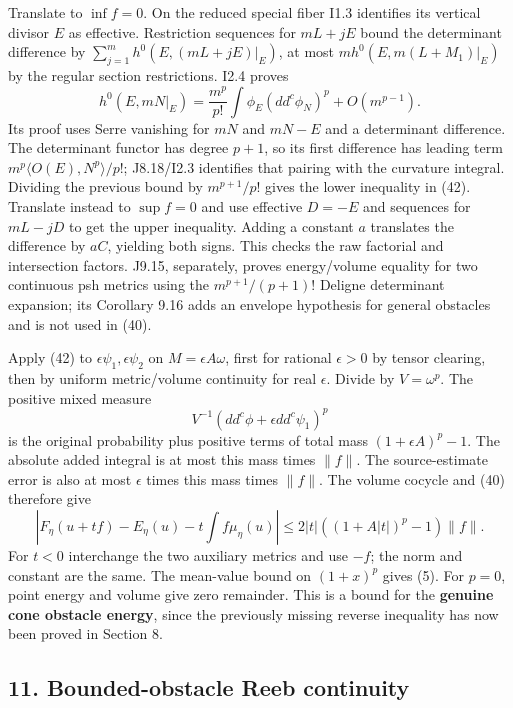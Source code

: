 \documentclass[
  10pt,
]{article}
\begin{document}
Translate to \(\inf f=0\). On the reduced special fiber I1.3 identifies
its vertical divisor \(E\) as effective. Restriction sequences for
\(mL+jE\) bound the determinant difference by
\(\sum_{j=1}^m h^0(E,(mL+jE)|_E)\), at most \(m h^0(E,m(L+M_1)|_E)\) by
the regular section restrictions. I2.4 proves
\[ h^0(E,mN|_E)=\frac{m^p}{p!}\int\phi_E(dd^c\phi_N)^p+O(m^{p-1}). \]
Its proof uses Serre vanishing for \(mN\) and \(mN-E\) and a determinant
difference. The determinant functor has degree \(p+1\), so its first
difference has leading term \(m^p\langle O(E),N^p\rangle/p!\);
J8.18/I2.3 identifies that pairing with the curvature integral. Dividing
the previous bound by \(m^{p+1}/p!\) gives the lower inequality in (42).
Translate instead to \(\sup f=0\) and use effective \(D=-E\) and
sequences for \(mL-jD\) to get the upper inequality. Adding a constant
\(a\) translates the difference by \(aC\), yielding both signs. This
checks the raw factorial and intersection factors. J9.15, separately,
proves energy/volume equality for two continuous psh metrics using the
\(m^{p+1}/(p+1)!\) Deligne determinant expansion; its Corollary 9.16
adds an envelope hypothesis for general obstacles and is not used in
(40).

Apply (42) to \(\epsilon\psi_1,\epsilon\psi_2\) on
\(M=\epsilon A\omega\), first for rational \(\epsilon>0\) by tensor
clearing, then by uniform metric/volume continuity for real
\(\epsilon\). Divide by \(V=\omega^p\). The positive mixed measure
\[ V^{-1}(dd^c\phi+\epsilon dd^c\psi_1)^p \] is the original probability
plus positive terms of total mass \((1+\epsilon A)^p-1\). The absolute
added integral is at most this mass times \(\|f\|\). The source-estimate
error is also at most \(\epsilon\) times this mass times \(\|f\|\). The
volume cocycle and (40) therefore give
\[ |F_\eta(u+tf)-E_\eta(u)-t\int f\mu_\eta(u)|
 \leq2|t|((1+A|t|)^p-1)\|f\|.                                                               \tag{43}\]
For \(t<0\) interchange the two auxiliary metrics and use \(-f\); the
norm and constant are the same. The mean-value bound on \((1+x)^p\)
gives (5). For \(p=0\), point energy and volume give zero remainder.
This is a bound for the \textbf{genuine cone obstacle energy}, since the
previously missing reverse inequality has now been proved in Section 8.

\subsection{11. Bounded-obstacle Reeb
continuity}\label{bounded-obstacle-reeb-continuity}
\end{document}
